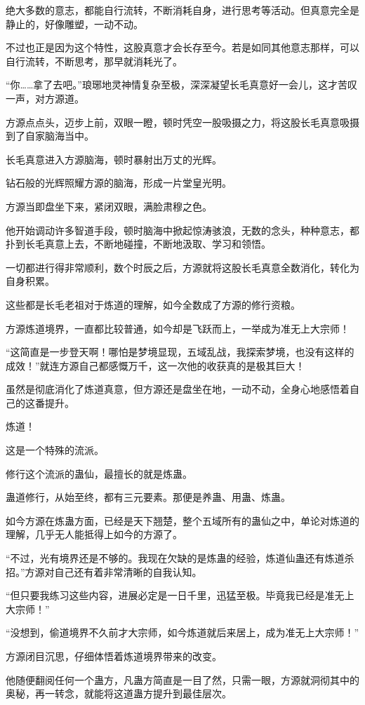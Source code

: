 \begin{this_body}
绝大多数的意志，都能自行流转，不断消耗自身，进行思考等活动。但真意完全是静止的，好像雕塑，一动不动。

不过也正是因为这个特性，这股真意才会长存至今。若是如同其他意志那样，可以自行流转，不断思考，那早就消耗光了。

“你……拿了去吧。”琅琊地灵神情复杂至极，深深凝望长毛真意好一会儿，这才苦叹一声，对方源道。

方源点点头，迈步上前，双眼一瞪，顿时凭空一股吸摄之力，将这股长毛真意吸摄到了自家脑海当中。

长毛真意进入方源脑海，顿时暴射出万丈的光辉。

钻石般的光辉照耀方源的脑海，形成一片堂皇光明。

方源当即盘坐下来，紧闭双眼，满脸肃穆之色。

他开始调动许多智道手段，顿时脑海中掀起惊涛骇浪，无数的念头，种种意志，都扑到长毛真意上去，不断地碰撞，不断地汲取、学习和领悟。

一切都进行得非常顺利，数个时辰之后，方源就将这股长毛真意全数消化，转化为自身积累。

这些都是长毛老祖对于炼道的理解，如今全数成了方源的修行资粮。

方源炼道境界，一直都比较普通，如今却是飞跃而上，一举成为准无上大宗师！

“这简直是一步登天啊！哪怕是梦境显现，五域乱战，我探索梦境，也没有这样的成效！”就连方源自己都感慨万千，这一次他的收获真的是极其巨大！

虽然是彻底消化了炼道真意，但方源还是盘坐在地，一动不动，全身心地感悟着自己的这番提升。

炼道！

这是一个特殊的流派。

修行这个流派的蛊仙，最擅长的就是炼蛊。

蛊道修行，从始至终，都有三元要素。那便是养蛊、用蛊、炼蛊。

如今方源在炼蛊方面，已经是天下翘楚，整个五域所有的蛊仙之中，单论对炼道的理解，几乎无人能抵得上如今的方源了。

“不过，光有境界还是不够的。我现在欠缺的是炼蛊的经验，炼道仙蛊还有炼道杀招。”方源对自己还有着非常清晰的自我认知。

“但只要我练习这些内容，进展必定是一日千里，迅猛至极。毕竟我已经是准无上大宗师！”

“没想到，偷道境界不久前才大宗师，如今炼道就后来居上，成为准无上大宗师！”

方源闭目沉思，仔细体悟着炼道境界带来的改变。

他随便翻阅任何一个蛊方，凡蛊方简直是一目了然，只需一眼，方源就洞彻其中的奥秘，再一转念，就能将这道蛊方提升到最佳层次。


\end{this_body}
